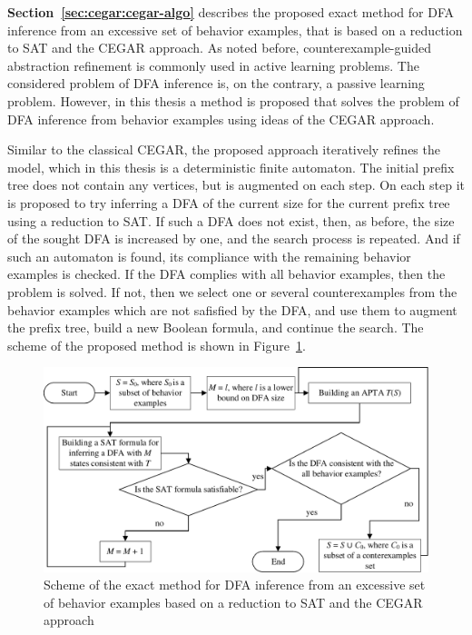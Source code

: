 \textbf{Section~\ref{sec:cegar:cegar-algo}} describes the proposed exact method for DFA inference from an excessive set of behavior examples, that is based on a reduction 
to SAT and the CEGAR approach.
As noted before, counterexample-guided abstraction refinement is commonly used in active learning problems.
The considered problem of DFA inference is, on the contrary, a passive learning problem.
However, in this thesis a method is proposed that solves the problem of DFA inference from behavior examples using ideas of the CEGAR approach.

Similar to the classical CEGAR, the proposed approach iteratively refines the model, which in this thesis is a deterministic finite automaton.
The initial prefix tree does not contain any vertices, but is augmented on each step.
On each step it is proposed to try inferring a DFA of the current size for the current prefix tree using a reduction to SAT.
If such a DFA does not exist, then, as before, the size of the sought DFA is increased by one, and the search process is repeated.
And if such an automaton is found, its compliance with the remaining behavior examples is checked.
If the DFA complies with all behavior examples, then the problem is solved.
If not, then we select one or several counterexamples from the behavior examples which are not safisfied by the DFA, and use them to augment the prefix tree,
build a new Boolean formula, and continue the search.
The scheme of the proposed method is shown in Figure~\ref{syn-en:img:cegar-algo}.

\begin{figure}[ht]
  \centering
  \includegraphics[scale=0.85]{img/ntv/cegar-en.pdf}
  \caption{Scheme of the exact method for DFA inference from an excessive set of behavior examples based on a reduction to SAT and the CEGAR approach}
  \label{syn-en:img:cegar-algo}
\end{figure}

